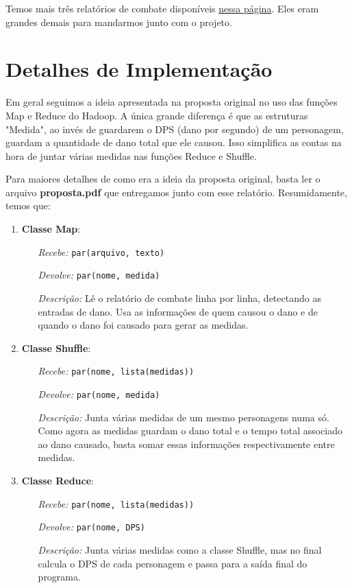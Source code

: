 \documentclass[a4paper,11pt]{article}
\begin{document}
  Temos mais três relatórios de combate disponíveis
  \href{http://www.linux.ime.usp.br/~gorobaum/logs/}{nessa página}. Eles eram
  grandes demais para mandarmos junto com o projeto.
  
\section{Detalhes de Implementação}

  Em geral seguimos a ideia apresentada na proposta original no uso das funções
  Map e Reduce do Hadoop. A única grande diferença é que as estruturas "Medida",
  ao invés de guardarem o DPS (dano por segundo) de um personagem, guardam a
  quantidade de dano total que ele causou. Isso simplifica as contas na hora de
  juntar várias medidas nas funções Reduce e Shuffle.
  
  Para maiores detalhes de como era a ideia da proposta original, basta ler o
  arquivo \textbf{proposta.pdf} que entregamos junto com esse relatório.
  Resumidamente, temos que:
  
  \begin{enumerate}
    \item
      \textbf{Classe Map}:
      \begin{itemize}
        \item[\textit{Recebe:}] \verb$par(arquivo, texto)$
        \item[\textit{Devolve:}] \verb$par(nome, medida)$
        \item[\textit{Descrição:}]
          Lê o relatório de combate linha por linha, detectando as entradas de
          dano. Usa as informações de quem causou o dano e de quando o dano foi
          causado para gerar as medidas.
      \end{itemize}
    \item
      \textbf{Classe Shuffle}:
      \begin{itemize}
        \item[\textit{Recebe:}] \verb$par(nome, lista(medidas))$
        \item[\textit{Devolve:}] \verb$par(nome, medida)$
        \item[\textit{Descrição:}]
          Junta várias medidas de um mesmo personagens numa só. Como agora as
          medidas guardam o dano total e o tempo total associado ao dano
          causado, basta somar essas informações respectivamente entre medidas.
      \end{itemize}
    \item
      \textbf{Classe Reduce}:
      \begin{itemize}
        \item[\textit{Recebe:}] \verb$par(nome, lista(medidas))$
        \item[\textit{Devolve:}] \verb$par(nome, DPS)$
        \item[\textit{Descrição:}]
          Junta várias medidas como a classe Shuffle, mas no final calcula o
          DPS de cada personagem e passa para a saída final do programa.
      \end{itemize}
  \end{enumerate}
  
\end{document}
